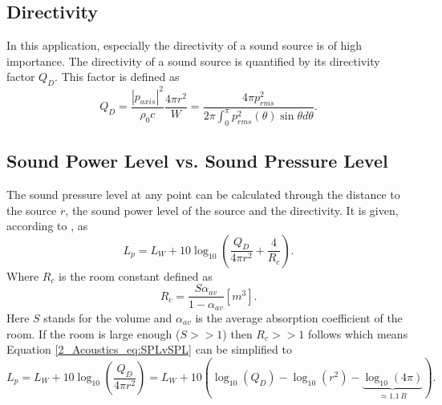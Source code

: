 \subsection{Directivity}
In this application, especially the directivity of a sound source is of high importance. 
The directivity of a sound source is quantified by its directivity factor $Q_D$. This factor is defined as \cite{DirectivityIndices}
\begin{equation}\label{2_Acoustics_eq:Directivity}
    Q_D = \frac{|p_{axis}|^2}{\rho_0 c}\frac{4 \pi r^2}{W} = \frac{4 \pi p_{rms}^2}{2\pi\int_0^{\pi}p^2_{rms}(\theta)\sin{\theta}d\theta}. 
\end{equation}
\subsection{Sound Power Level vs. Sound Pressure Level}
The sound pressure level at any point can be calculated through the distance to the source $r$, the sound power level of the source and the directivity. It is given, according to \cite{Relationship_Sound_pressure}, as
\begin{equation}\label{2_Acoustics_eq:SPLvSPL}
    L_p = L_W + 10\log_{10}\left( \frac{Q_D}{4 \pi r^2} + \frac{4}{R_c} \right ).
\end{equation}
Where $R_c$ is the room constant defined as
\begin{equation}
    R_c = \frac{S\alpha_{av}}{1 - \alpha_{av}} [m^3].
\end{equation}
Here $S$ stands for the volume  and $\alpha_{av}$ is the average absorption coefficient of the room.  If the room is large enough ($S >> 1$) then $R_c >> 1$ follows which means Equation \ref{2_Acoustics_eq:SPLvSPL} can be simplified to
\begin{equation}
     L_p 
     = 
     L_W + 10\log_{10}\left( \frac{Q_D}{4 \pi r^2} \right ) 
     =
     L_W + 10\left ( \log_{10}(Q_D) - \log_{10}(r^2) - \underbrace{\log_{10}(4\pi)}_{\approx 1.1 \, B}  \right ). 
\end{equation}